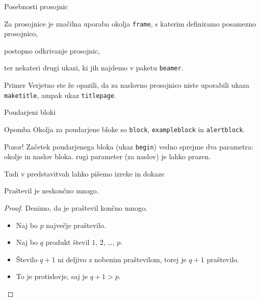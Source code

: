 \begin{frame}{Posebnosti prosojnic}

	Za prosojnice je značilna uporaba okolja \texttt{frame},
	s katerim definiramo posamezno prosojnico,
	
	\pause

	postopno odkrivanje prosojnic,

	\pause

	ter nekateri drugi ukazi, ki jih najdemo v paketu \texttt{beamer}.
	
	\pause

	\begin{exampleblock}{Primer}
		Verjetno ste že opazili, da za naslovno prosojnico niste uporabili
		ukaza \texttt{maketitle}, ampak ukaz \texttt{titlepage}.
	\end{exampleblock}
\end{frame}

\begin{frame}{Poudarjeni bloki}

\begin{block}{Opomba}
Okolja za poudarjene bloke so \texttt{block}, \texttt{exampleblock} in \texttt{alertblock}.
\end{block}

\begin{block}{Pozor!}
Začetek poudarjenega bloka (ukaz \texttt{begin}) vedno sprejme 
dva parametra: okolje in naslov bloka.
rugi parameter (za naslov) je lahko prazen. 
\end{block}

\end{frame}

\begin{frame}{Tudi v predstavitvah lahko pišemo izreke in dokaze}

	\begin{izrek}
	   Praštevil je neskončno mnogo.
	\end{izrek}
	\begin{proof}
	   Denimo, da je praštevil končno mnogo.
	   \begin{itemize}
		  \item<4-> Naj bo $p$ \alert{največje} praštevilo.
		  \item<1-> Naj bo $q$ produkt števil $1$, $2$, \ldots, $p$.
		  \item<2-> Število $q+1$ ni deljivo z nobenim praštevilom, torej je $q+1$ praštevilo.
		  \item<3> To je protislovje, saj je $q+1>p$. \qedhere
	   \end{itemize}
	\end{proof}
\end{frame}
 

